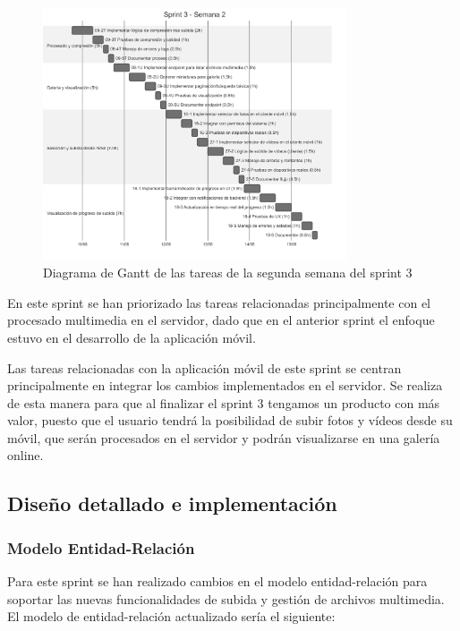 \begin{figure}[H]
    \begin{center}
        \includegraphics[width=0.8\textwidth]{assets/sprint3/week2-gantt.png}
    \end{center}
    \caption{Diagrama de Gantt de las tareas de la segunda semana del sprint 3}\label{fig:gantt-sprint3-week2}
\end{figure}

En este sprint se han priorizado las tareas relacionadas principalmente con el procesado multimedia en el servidor, dado que en el anterior sprint el enfoque estuvo en el desarrollo de la aplicación móvil.

Las tareas relacionadas con la aplicación móvil de este sprint se centran principalmente en integrar los cambios implementados en el servidor.
Se realiza de esta manera para que al finalizar el sprint 3 tengamos un producto con más valor, puesto que el usuario tendrá la posibilidad de subir fotos y vídeos desde su móvil, que serán procesados en el servidor y podrán visualizarse en una galería online.

\subsection{Diseño detallado e implementación}
\subsubsection{Modelo Entidad-Relación}

Para este sprint se han realizado cambios en el modelo entidad-relación para soportar las nuevas funcionalidades de subida y gestión de archivos multimedia.
El modelo de entidad-relación actualizado sería el siguiente:


